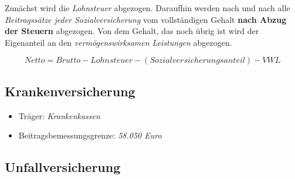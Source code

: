 \documentclass[a4paper, 12pt]{report}
\begin{document}
\begin{multicols}{2}
Zunächst wird die \emph{Lohnsteuer} abgezogen. Daraufhin werden nach und nach
alle \emph{Beitragssätze jeder Sozialversicherung} vom vollständigen
Gehalt \textbf{nach Abzug der Steuern} abgezogen. Von dem Gehalt, das noch übrig
ist wird der Eigenanteil an den \emph{vermögenswirksamen Leistungen} abgezogen.


\begin{center}
    \begin{equation}
	Netto = Brutto - Lohnsteuer - (Sozialversicherungsanteil) - VWL
    \end{equation}
\end{center}

\subsection{Krankenversicherung}

\begin{itemize}
    \item Träger: \emph{Krankenkassen}
    \item Beitragsbemessungsgrenze: \emph{58.050 Euro}
\end{itemize}

\subsection{Unfallversicherung}


\end{multicols}
\end{document}
